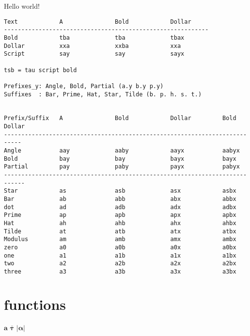 \documentclass[12pt]{article}
\begin{document}
Hello world!


\begin{verbatim}
Text            A               Bold            Dollar
-----------------------------------------------------------
Bold            tba             tba             tbax
Dollar          xxa             xxba            xxa
Script          say             say             sayx

tsb = tau script bold

Prefixes_y: Angle, Bold, Partial (a.y b.y p.y)
Suffixes  : Bar, Prime, Hat, Star, Tilde (b. p. h. s. t.)


Prefix/Suffix   A               Bold            Dollar         Bold Dollar
---------------------------------------------------------------------------
Angle           aay             aaby            aayx           aabyx
Bold            bay             bay             bayx           bayx    
Partial         pay             paby            payx           pabyx
----------------------------------------------------------------------------
Star            as              asb             asx            asbx
Bar             ab              abb             abx            abbx
dot             ad              adb             adx            adbx
Prime           ap              apb             apx            apbx
Hat             ah              ahb             ahx            ahbx
Tilde           at              atb             atx            atbx
Modulus         am              amb             amx            ambx
zero            a0              a0b             a0x            a0bx
one             a1              a1b             a1x            a1bx
two             a2              a2b             a2x            a2bx
three           a3              a3b             a3x            a3bx
\end{verbatim}

\section{functions}
\boldsymbol{\a} $\boldsymbol{a}$ $\boldsymbol{\bar{\tau}}$ $\lvert\boldsymbol{\alpha}\rvert$  

 
\end{document}
